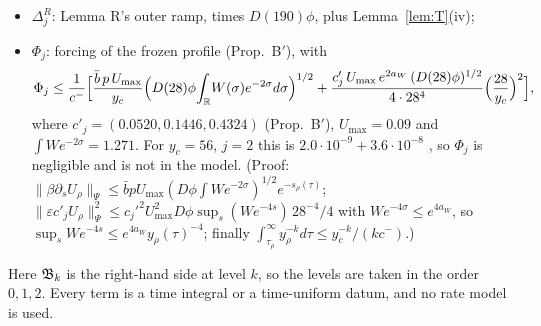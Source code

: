 \documentclass[11pt]{article}
\theoremstyle{remark}\newtheorem{remark}[theorem]{Remark}
\begin{document}
\begin{proposition}
\begin{itemize}[leftmargin=*,itemsep=1pt]
\item $\Delta^R_j$: Lemma R's outer ramp, times $D(190)\phi$, plus Lemma~\ref{lem:T}(iv);
\item $\Phi_j$: forcing of the frozen profile (Prop.~B$'$), with
\[
\Phi_j\le\frac1{c^-}\Bigl[\frac{\bar b\,p\,U_{\max}}{y_c}\Bigl(D(28)\phi\!\int_{\mathbb R}\!W(\sigma)e^{-2\sigma}d\sigma\Bigr)^{1/2}+\frac{c'_j\,U_{\max}\,e^{2a_W}\,(D(28)\phi)^{1/2}}{4\cdot28^4}\Bigl(\frac{28}{y_c}\Bigr)^2\Bigr],
\]
where $c'_j=(0.0520,0.1446,0.4324)$ (Prop.~B$'$), $U_{\max}=0.09$ and $\int We^{-2\sigma}=1.271$. For $y_c=56$, $j=2$ this is $2.0\cdot10^{-9}+3.6\cdot10^{-8}$ \tE, so $\Phi_j$ is negligible and is not in the model. (Proof: $\|\beta\partial_sU_\rho\|_\Psi\le\bar bpU_{\max}(D\phi\int We^{-2\sigma})^{1/2}e^{-s_\rho(\tau)}$; $\|\varepsilon c'_jU_\rho\|_\Psi^2\le c_j'^2U_{\max}^2D\phi\sup_s(We^{-4s})\,28^{-4}/4$ with $We^{-4\sigma}\le e^{4a_W}$, so $\sup_s We^{-4s}\le e^{4a_W}y_\rho(\tau)^{-4}$; finally $\int_{\tau_\rho}^\infty y_\rho^{-k}d\tau\le y_c^{-k}/(kc^-)$.)
\end{itemize}
Here $\mathfrak B_k$ is the right-hand side at level $k$, so the levels are taken in the order $0,1,2$. Every term is a time integral or a time-uniform datum, and no rate model is used.
\end{proposition}
\end{document}
